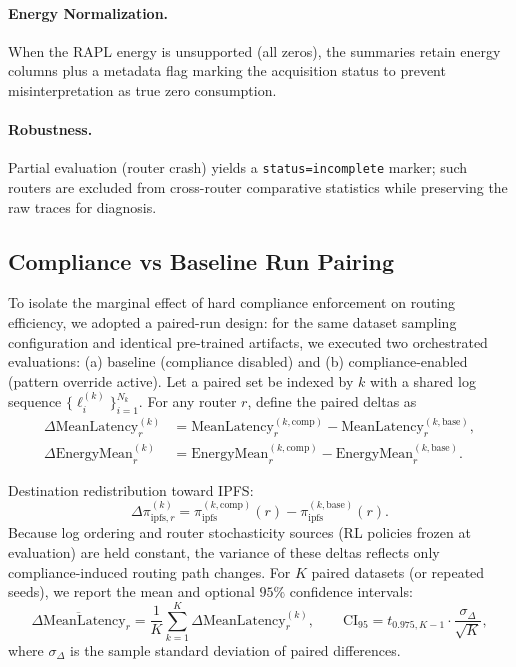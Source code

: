 \paragraph{Energy Normalization.} When the RAPL energy is unsupported (all zeros), the summaries retain energy columns plus a metadata flag marking the acquisition status to prevent misinterpretation as true zero consumption.

\paragraph{Robustness.} Partial evaluation (router crash) yields a \texttt{status=incomplete} marker; such routers are excluded from cross-router comparative statistics while preserving the raw traces for diagnosis.

\subsection{Compliance vs Baseline Run Pairing}
\label{s:orchestration-compliance-pairing}
To isolate the marginal effect of hard compliance enforcement on routing efficiency, we adopted a paired-run design: for the same dataset sampling configuration and identical pre-trained artifacts, we executed two orchestrated evaluations: (a) baseline (compliance disabled) and (b) compliance-enabled (pattern override active). Let a paired set be indexed by $k$ with a shared log sequence $\{\ell_i^{(k)}\}_{i=1}^{N_k}$. For any router $r$, define the paired deltas as
\begin{align}
\Delta \text{MeanLatency}_r^{(k)} 
  &= \text{MeanLatency}_r^{(k,\text{comp})} - \text{MeanLatency}_r^{(k,\text{base})}, \\
\Delta \text{EnergyMean}_r^{(k)} 
  &= \text{EnergyMean}_r^{(k,\text{comp})} - \text{EnergyMean}_r^{(k,\text{base})}.
\end{align}

Destination redistribution toward IPFS:
\[
\Delta \pi_{\text{ipfs},r}^{(k)} = \pi_{\text{ipfs}}^{(k,\text{comp})}(r) - \pi_{\text{ipfs}}^{(k,\text{base})}(r).
\]
Because log ordering and router stochasticity sources (RL policies frozen at evaluation) are held constant, the variance of these deltas reflects only compliance-induced routing path changes. For $K$ paired datasets (or repeated seeds), we report the mean and optional $95\%$ confidence intervals:
\[
\overline{\Delta \text{MeanLatency}}_r = \frac{1}{K} \sum_{k=1}^K \Delta \text{MeanLatency}_r^{(k)}, \qquad
\text{CI}_{95} = t_{0.975, K-1}\cdot \frac{\sigma_{\Delta}}{\sqrt{K}},
\]
where $\sigma_{\Delta}$ is the sample standard deviation of paired differences.

